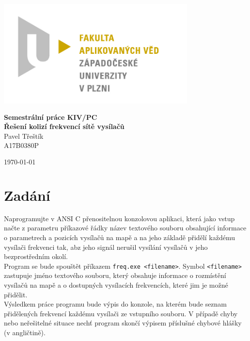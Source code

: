 \documentclass[12pt]{article}
\begin{document}
\begin{titlepage}
\centerline{\includegraphics[width=10cm]{img/logo.jpg}}
\begin{center}
\vspace{30px}
{\Huge
\textbf{Semestrální práce KIV/PC}\\
\vspace{1cm}
}
{\Large
\textbf{Řešení kolizí frekvencí sítě vysílačů}\\
}
\vspace{1cm}
{\large
Pavel Třeštík\\
}
{\normalsize
A17B0380P
}
\end{center}
\vspace{\fill}
\hfill
\begin{minipage}[t]{7cm}
\flushright
\today
\end{minipage}
\end{titlepage}

\tableofcontents
\newpage
{} %
%
\section{Zadání}
%
Naprogramujte v ANSI C přenositelnou konzolovou aplikaci, která jako vstup
načte z parametru příkazové řádky název textového souboru obsahující
informace o parametrech a pozicích vysílačů na mapě a na jeho základě
přidělí každému vysílači frekvenci tak, abz jeho signál nerušil
vysílání vysílačů v jeho bezprostředním okolí.\\

Program se bude spouštět příkazem \texttt{freq.exe <filename>}. Symbol
\texttt{<filename>} zastupuje jméno textového souboru, který obsahuje
informace o rozmístění vysílačů na mapě a o dostupných vysílacích
frekvencích, které jim je možné přidělit.\\

Výsledkem práce programu bude výpis do konzole, na kterém bude seznam
přidělených frekvencí každému vysílači ze vstupního souboru. V případě
chyby nebo neřešitelné situace nechť program skončí výpisem příslušné
chybové hlášky (v angličtině).\\
\end{document}
